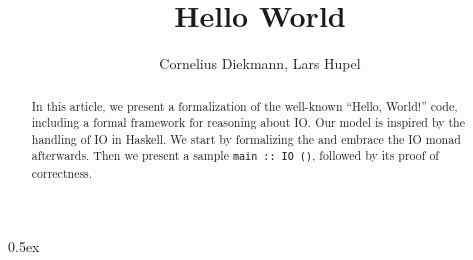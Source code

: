\documentclass[11pt,a4paper]{article}
\newcommand{\isactrlurl}[0]{\Mundus}
\begin{document}
\title{Hello World}
\author{Cornelius Diekmann, Lars Hupel}
\maketitle

\begin{abstract}
In this article, we present a formalization of the well-known ``Hello, World!'' code, including a formal framework for reasoning about IO.
Our model is inspired by the handling of IO in Haskell.
We start by formalizing the \isactrlurl{} and embrace the IO monad afterwards.
Then we present a sample \verb~main :: IO ()~, followed by its proof of correctness.
\end{abstract}

\tableofcontents

\parindent 0pt\parskip 0.5ex



%
%
\end{document}
